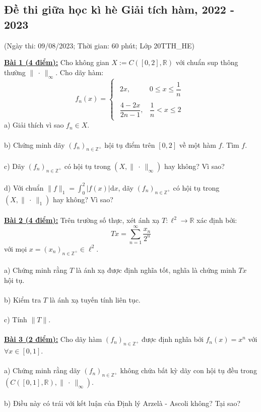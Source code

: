 \documentclass[10pt, a4paper]{article}
\begin{document}
\subsection{Đề thi giữa học kì hè Giải tích hàm, 2022 - 2023}
\begin{center}
	\color{blue}(Ngày thi: 09/08/2023; Thời gian: 60 phút; Lớp 20TTH\_HE)
\end{center}
\color{red}\underline{\textbf{Bài 1 (4 điểm):}} \color{black}Cho không gian $X:=C([0,2],\mathbb R)$ với chuẩn sup thông thường $\lVert~\cdot~\rVert_\infty$. Cho dãy hàm:$$f_n(x)=\begin{cases}
\begin{array}{ll}
	2x, & 0\le x\le\dfrac1n\\\\
	\dfrac{4-2x}{2n-1}, & \dfrac1n<x\le2
\end{array}
\end{cases}$$
\color{red}a) \color{black}Giải thích vì sao $f_n\in X$.\\\\
\color{red}b) \color{black}Chứng minh dãy $(f_n)_{n\in\mathbb Z^+}$ hội tụ điểm trên $[0,2]$ về một hàm $f$. Tìm $f$.\\\\
\color{red}c) \color{black}Dãy $(f_n)_{n\in\mathbb Z^+}$ có hội tụ trong $(X,\lVert~\cdot~\rVert_\infty)$ hay không? Vì sao?\\\\
\color{red}d) \color{black}Với chuẩn $\lVert f\rVert_1=\displaystyle\int_0^2|f(x)|\text{d}x$, dãy $(f_n)_{n\in\mathbb Z^+}$ có hội tụ trong $(X,\lVert~\cdot~\rVert_1)$ hay không? Vì sao?\\\\
\color{red}\underline{\textbf{Bài 2 (4 điểm):}} \color{black}Trên trường số thực, xét ánh xạ $T:\ell^2\rightarrow\mathbb R$ xác định bởi: $$Tx=\displaystyle\sum_{n=1}^\infty\dfrac{x_n}{2^n}$$ với mọi $x=(x_n)_{n\in\mathbb Z^+}\in\ell^2$.\\\\
\color{red}a) \color{black}Chứng minh rằng $T$ là ánh xạ được định nghĩa tốt, nghĩa là chứng minh $Tx$ hội tụ.\\\\
\color{red}b) \color{black}Kiểm tra $T$ là ánh xạ tuyến tính liên tục.\\\\
\color{red}c) \color{black}Tính $\lVert T\rVert$.\\\\
\color{red}\underline{\textbf{Bài 3 (2 điểm):}} \color{black}Cho dãy hàm $(f_n)_{n\in\mathbb Z^+}$ được định nghĩa bởi $f_n(x)=x^n$ với $\forall x\in[0,1]$.\\\\
\color{red}a) \color{black}Chứng minh rằng dãy $(f_n)_{n\in\mathbb Z^+}$ không chứa bất kỳ dãy con hội tụ đều trong $(C([0,1],\mathbb R),\lVert~\cdot~\rVert_\infty)$.\\\\
\color{red}b) \color{black}Điều này có trái với kết luận của Định lý Arzelà - Ascoli không? Tại sao?
\end{document}
